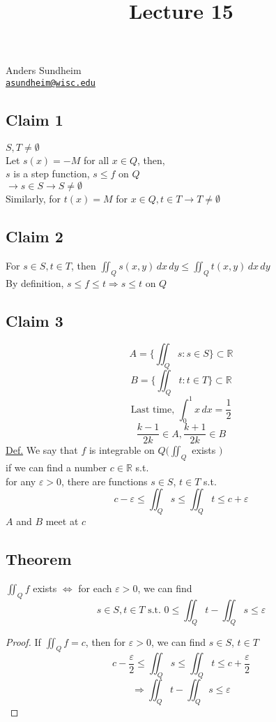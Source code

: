 \documentclass[12pt]{article}
\title{Lecture 15}
\newcommand{\BR}{\mathbb R}
\begin{document}
\maketitle
\vspace*{-0.25in}
\begin{center}
	Anders Sundheim \\
	\href{mailto:asundheim@wisc.edu}{{\tt asundheim@wisc.edu}}
\end{center}
\subsection*{Claim 1}
$S,T\neq\emptyset$ \\
Let $s(x)=-M$ for all $x\in Q$, then, \\
$s$ is a step function, $s\leq f$ on $Q$ \\
$\rightarrow s\in S\rightarrow S\neq\emptyset$ \\
Similarly, for $t(x)=M$ for $x\in Q, t\in T\rightarrow T\neq\emptyset$ \\
\subsection*{Claim 2}
For $s\in S, t\in T$, then $\iint_Qs(x,y)\,dx\,dy\leq\iint_Qt(x,y)\,dx\,dy$ \\
By definition, $s\leq f\leq t\Rightarrow s\leq t$ on $Q$ \\
\subsection*{Claim 3}
\[ A=\Big\{\iint_Qs: s\in S\Big\}\subset\BR \]
\[ B=\Big\{\iint_Qt: t\in T\Big\}\subset\BR \]
\[ \text{Last time, }\int_0^1x\,dx=\frac{1}{2} \]
\[ \frac{k-1}{2k}\in A, \frac{k+1}{2k}\in B \]
\underline{Def.} We say that $f$ is integrable on $Q\Big(\iint_Q$ exists $\Big)$ \\
if we can find a number $c\in\BR$ s.t. \\
for any $\varepsilon>0$, there are functions $s\in S$, $t\in T$ s.t. \\
\[ c-\varepsilon\leq\iint_Qs\leq\iint_Qt\leq c+\varepsilon \]
$A$ and $B$ meet at $c$ \\
\subsection*{Theorem}
$\iint_{Q}f$ exists $\Leftrightarrow$ for each $\varepsilon>0$, we can find \\
\[ s\in S, t\in T\text{ s.t. } 0\leq\iint_Qt-\iint_Qs\leq\varepsilon \]
\begin{proof}
  If $\iint_Qf=c$, then for $\varepsilon>0$, we can find $s\in S$, $t\in T$ \\
  \[ c-\frac{\varepsilon}{2}\leq\iint_Qs\leq\iint_Qt\leq c+\frac{\varepsilon}{2} \]
  \[ \Rightarrow\iint_Qt-\iint_Qs\leq\varepsilon \]
\end{proof}
\end{document}
